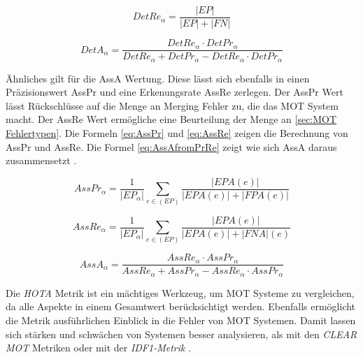 \begin{equation}
    \label{eq:DetRe}
    DetRe_{\alpha} = \frac{|EP|}{|EP| + |FN|}
\end{equation}

\begin{equation}
    \label{eq:DetAfromPrRe}
    DetA_{\alpha} = \frac{ DetRe_{\alpha} \cdot DetPr_{\alpha} }{ DetRe_{\alpha} + DetPr_{\alpha} -  DetRe_{\alpha} \cdot DetPr_{\alpha}}
\end{equation}

Ähnliches gilt für die \gls{AssA} Wertung. Diese lässt sich ebenfalls in einen  Präzisionswert \gls{AssPr} und eine Erkenungsrate \gls{AssRe} zerlegen. Der \gls{AssPr} Wert lässt Rückschlüsse auf die Menge an \gls{Merging Fehler} zu, die das \gls{MOT} System macht. Der \gls{AssRe} Wert ermögliche eine Beurteilung der Menge an  \ref{sec:MOT Fehlertypen}. Die Formeln \ref{eq:AssPr} und \ref{eq:AssRe} zeigen die Berechnung von \gls{AssPr} und \gls{AssRe}. Die Formel \ref{eq:AssAfromPrRe} zeigt wie sich \gls{AssA} daraus zusammensetzt \cite{HOTA}. 

\begin{equation}
    \label{eq:AssPr}
    AssPr_{\alpha} =  \frac{1}{|EP_{\alpha}|} \sum_{e \in (EP)} \frac{|EPA(e)|}{|EPA(e)| + |FPA(e)|}
\end{equation}

\begin{equation}
    \label{eq:AssRe}
    AssRe_{\alpha} = \frac{1}{|EP_{\alpha}|} \sum_{e \in (EP)} \frac{|EPA(e)|}{|EPA(e)| + |FNA|(e)}
\end{equation}

\begin{equation}
    \label{eq:AssAfromPrRe}
    AssA_{\alpha} = \frac{AssRe_{\alpha} \cdot AssPr_{\alpha} }{AssRe_{\alpha} + AssPr_{\alpha} - AssRe_{\alpha} \cdot AssPr_{\alpha}}
\end{equation}

Die \textit{\gls{HOTA}} Metrik ist ein mächtiges Werkzeug, um \gls{MOT} Systeme zu vergleichen, da alle Aspekte in einem Gesamtwert berücksichtigt werden. Ebenfalls ermöglicht die Metrik ausführlichen Einblick in die Fehler von \gls{MOT} Systemen. Damit lassen sich stärken und schwächen von Systemen besser analysieren, als mit den \textit{\acrshort{CLEAR} \gls{MOT}} Metriken oder mit der \textit{\gls{IDF1}-Metrik} \cite{HOTA}. 